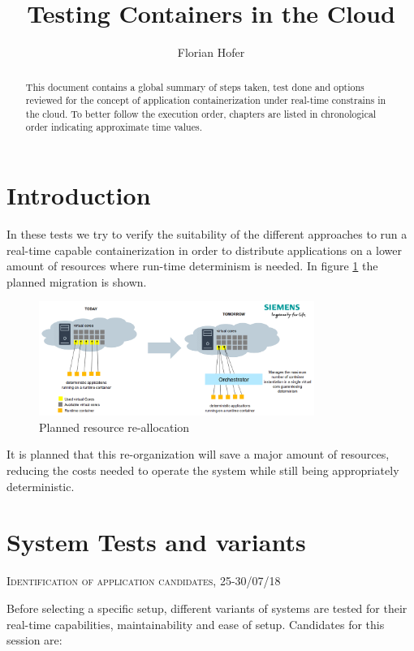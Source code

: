 \documentclass[]{scrartcl}
\title{Testing Containers in the Cloud}
\author{Florian Hofer}
\date{}
\begin{document}
\maketitle

\begin{abstract}
	This document contains a global summary of steps taken, test done and options reviewed for the concept of application containerization under real-time constrains in the cloud. To better follow the execution order, chapters are listed in chronological order indicating approximate time values.
\end{abstract}

\section{Introduction}

In these tests we try to verify the suitability of the different approaches to run a real-time capable containerization in order to distribute applications on a lower amount of resources where run-time determinism is needed. In figure \ref{fig:plan} the planned migration is shown. 

\begin{figure}
	\centering
	\includegraphics[width=0.8\textwidth]{plan}
	\caption{Planned resource re-allocation}
	\label{fig:plan}
\end{figure}

It is planned that this re-organization will save a major amount of resources, reducing the costs needed to operate the system while still being appropriately deterministic.

\section{System Tests and variants}

{\small\textsc{Identification of application candidates, 25-30/07/18} \bigskip}

Before selecting a specific setup, different variants of systems are tested for their real-time capabilities, maintainability and ease of setup. Candidates for this session are:
\end{document}
